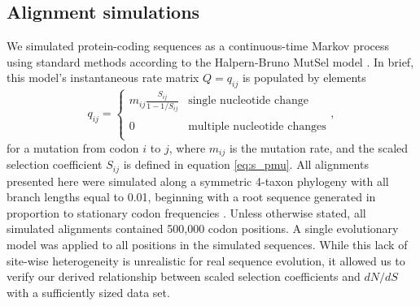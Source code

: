 \documentclass[11pt]{article}
\begin{document}
\subsection*{Alignment simulations}
We simulated protein-coding sequences as a continuous-time Markov process using standard methods \citep{Yang2006} according to the Halpern-Bruno MutSel model \citep{HalpernBruno1998}. In brief, this model's instantaneous rate matrix $Q = q_{ij}$ is populated by elements
\begin{equation}\label{eq:HBmatrix}
q_{ij} = \left\{ 
\begin{array}{rl}
m_{ij} \frac{S_{ij}}{1-1/S_{ij}} &\text{single nucleotide change} \\\\
0                                  &\text{multiple nucleotide changes} \\             
\end{array} \right.,
\end{equation} for a mutation from codon $i$ to $j$, where $m_{ij}$ is the mutation rate, and the scaled selection coefficient $S_{ij}$ is defined in equation \eqref{eq:s_pmu}. All alignments presented here were simulated along a symmetric 4-taxon phylogeny with all branch lengths equal to 0.01, beginning with a root sequence generated in proportion to  stationary codon frequencies \citep{Yang2006}. Unless otherwise stated, all simulated alignments contained 500,000 codon positions. A single evolutionary model was applied to all positions in the simulated sequences. While this lack of site-wise heterogeneity is unrealistic for real sequence evolution, it allowed us to verify our derived relationship between scaled selection coefficients and $dN/dS$ with a sufficiently sized data set. 
\end{document}
